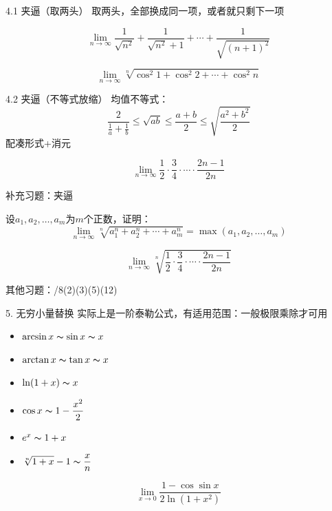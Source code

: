 \documentclass{myslide}
\begin{document}
\begin{frame}{4.1 夹逼（取两头）}
取两头，全部换成同一项，或者就只剩下一项
\begin{example}[17复旦高数]
\[\lim_{n\to\infty}\frac{1}{\sqrt{n^2}}+\frac{1}{\sqrt{n^2}+1}+\cdots+\frac{1}{\sqrt{(n+1)^2}}\]
\end{example}
\begin{example}[17数分期中]
\[\lim_{n\to\infty}\sqrt[n]{\cos^2 1+\cos^2 2+\cdots+\cos^2 n}\]
\end{example}
\end{frame}

\begin{frame}{4.2 夹逼（不等式放缩）}
均值不等式：
\[\frac{2}{\frac{1}{a}+\frac{1}{b}}\leq\sqrt{ab}\leq\frac{a+b}{2}\leq\sqrt{\frac{a^2+b^2}{2}}\]
配凑形式+消元
\begin{example}[\textsection 3.2/8(9)]
\[\lim_{n\to\infty}\frac{1}{2}\cdot\frac{3}{4}\cdot\cdots\cdot\frac{2n-1}{2n}\]
\end{example}
\end{frame}

\begin{frame}{补充习题：夹逼}
\begin{exercise}[\textsection 3.2/11]
设$a_1,a_2,\ldots,a_m$为$m$个正数，证明：
\[\lim_{n\to\infty}\sqrt[n]{a_1^n+a_2^n+\cdots+a_m^n}=\max(a_1,a_2,\ldots,a_m)\]
\end{exercise}
\begin{exercise}[\textsection 3.2/8(10)]
\[\lim_{n\to\infty}\sqrt[n]{\frac{1}{2}\cdot\frac{3}{4}\cdot\cdots\cdot\frac{2n-1}{2n}}\]
\end{exercise}
其他习题：/8(2)(3)(5)(12)
\end{frame}

\begin{frame}{5. 无穷小量替换}
实际上是一阶泰勒公式，有适用范围：一般极限乘除才可用
\begin{itemize}
	\item $\arcsin x\thicksim\sin x\thicksim x$
	\item $\arctan x\thicksim\tan x\thicksim x$
	\item $\ln(1+x)\thicksim x$
	\item $\displaystyle \cos x\thicksim 1-\frac{x^2}{2}$
	\item $e^x\thicksim 1+x$
	\item $\displaystyle \sqrt[n]{1+x}-1\thicksim\frac{x}{n}$
\end{itemize}
\begin{example}
\[\lim_{x\to 0}\frac{1-\cos\sin x}{2\ln(1+x^2)}\] %
\end{example}
\end{frame}
\end{document}
